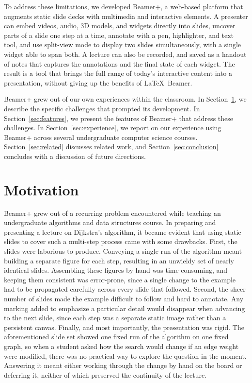 \documentclass[sigconf]{acmart}
\begin{document}
To address these limitations, we developed Beamer+, a web-based platform that augments static slide decks with multimedia and interactive elements. A presenter can embed videos, audio, 3D models, and widgets directly into slides, uncover parts of a slide one step at a time, annotate with a pen, highlighter, and text tool, and use split-view mode to display two slides simultaneously, with a single widget able to span both. A lecture can also be recorded, and saved as a handout of notes that captures the annotations and the final state of each widget. The result is a tool that brings the full range of today's interactive content into a presentation, without giving up the benefits of \LaTeX\ Beamer.

Beamer+ grew out of our own experiences within the classroom. In Section~\ref{sec:motivation}, we describe the specific challenges that prompted its development. In Section~\ref{sec:features}, we present the features of Beamer+ that address these challenges. In Section~\ref{sec:experience}, we report on our experience using Beamer+ across several undergraduate computer science courses. Section~\ref{sec:related} discusses related work, and Section~\ref{sec:conclusion} concludes with a discussion of future directions.

\section{Motivation}
\label{sec:motivation}
Beamer+ grew out of a recurring problem encountered while teaching an undergraduate algorithms and data structures course. In preparing and presenting a lecture on Dijkstra's algorithm, it became evident that using static slides to cover such a multi-step process came with some drawbacks. First, the slides were laborious to produce. Conveying a single run of the algorithm meant building a separate figure for each step, resulting in an unwieldy set of nearly identical slides. Assembling these figures by hand was time-consuming, and keeping them consistent was error-prone, since a single change to the example had to be propagated carefully across every slide that followed. Second, the sheer number of slides made the example difficult to follow and hard to annotate. Any marking added to emphasize a particular detail would disappear when advancing to the next slide, since each step was a separate static image rather than a persistent canvas. Finally, and most importantly, the presentation was rigid. The aforementioned slide set showed one fixed run of the algorithm on one fixed graph, so when a student asked how the search would change if an edge weight were modified, there was no practical way to explore the question in the moment. Answering it meant either working through the change by hand on the board or deferring it, neither of which preserved the continuity of the lecture.
\end{document}

